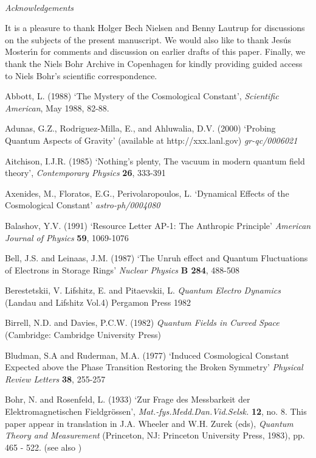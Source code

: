 \documentclass[12pt]{article}
\begin{document}
\ \\
{\em Acknowledgements}

\noindent
It is a pleasure to thank Holger Bech Nielsen and Benny Lautrup
for discussions on the subjects of the present manuscript. We
would also like to thank Jes\' us Moster{\'\i}n for comments and
discussion on earlier drafts of this paper. Finally, we thank
the Niels Bohr Archive in Copenhagen for kindly providing
guided access to Niels Bohr's scientific correspondence. 

 

\newpage
\begin{thebibliography}{X}

Abbott, L. (1988) `The Mystery of the Cosmological Constant',
{\em Scientific American}, May 1988, 82-88.

 Adunas, G.Z., Rodriguez-Milla, E., and Ahluwalia, D.V.
(2000) `Probing Quantum Aspects of Gravity' (available at 
http://xxx.lanl.gov) {\em gr-qc/0006021}

 Aitchison, I.J.R. (1985) `Nothing's plenty, The vacuum in
modern quantum field theory', {\em Contemporary Physics} {\bf 26},
333-391

 Axenides, M., Floratos, E.G., Perivolaropoulos, L.
`Dynamical Effects of the Cosmological Constant' 
{\em astro-ph/0004080}
     
Balashov, Y.V. (1991) `Resource Letter AP-1: The Anthropic
Principle' {\em American Journal of Physics} {\bf 59}, 
 1069-1076

Bell, J.S. and Leinaas, J.M. (1987) `The Unruh effect and Quantum
Fluctuations of Electrons in Storage Rings' {\em Nuclear Physics}
{\bf B 284}, 488-508

 Berestetskii, V. Lifshitz, E. and 
Pitaevskii, L. {\em Quantum Electro Dynamics} (Landau and
Lifshitz Vol.4) Pergamon Press 1982

 Birrell, N.D. and Davies, P.C.W. (1982)
{\em Quantum Fields in Curved Space}
(Cambridge: Cambridge University Press)

Bludman, S.A and Ruderman, M.A. (1977) `Induced Cosmological Constant 
Expected above the Phase Transition Restoring the Broken Symmetry'
{\em Physical Review Letters} {\bf 38}, 255-257

Bohr, N. and Rosenfeld, L. (1933) `Zur Frage des Messbarkeit der Elektromagnetischen
Fieldgr\"{o}ssen', {\em Mat.-fys.Medd.Dan.Vid.Selsk.} {\bf 12},
no. 8. This paper appear in translation in
J.A. Wheeler and W.H. Zurek (eds), {\em Quantum Theory and Measurement}
(Princeton, NJ: Princeton University Press, 1983), pp. 465 - 522.
(see also \cite{kalckar96})


\end{thebibliography}
\end{document}
